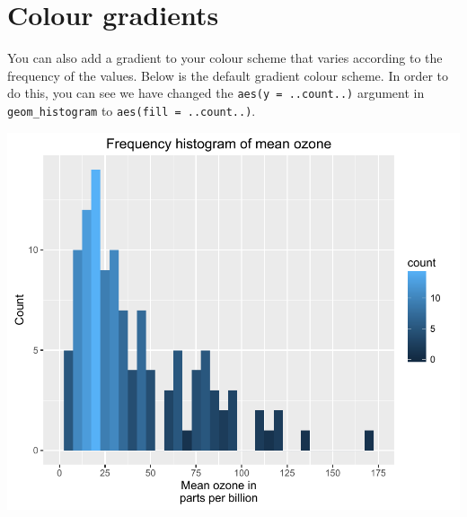 \section{Colour gradients}\label{colour-gradients}

You can also add a gradient to your colour scheme that varies according
to the frequency of the values. Below is the default gradient colour
scheme. In order to do this, you can see we have changed the
\texttt{aes(y\ =\ ..count..)} argument in \texttt{geom\_histogram} to
\texttt{aes(fill\ =\ ..count..)}.

\begin{Shaded}
\begin{Highlighting}[]
\StringTok{ }\NormalTok{(} \StringTok{ }
\StringTok{  }\NormalTok{(}\NormalTok{(}  \NormalTok{) +}
\StringTok{  }\NormalTok{(} \NormalTok{,}
     \NormalTok{(}\NormalTok{, }\NormalTok{, }\NormalTok{), }\NormalTok{(}\NormalTok{, }\NormalTok{)) +}
\StringTok{  }\NormalTok{(} \NormalTok{) +}
\StringTok{  }\NormalTok{(}\NormalTok{)}
\end{Highlighting}
\end{Shaded}

\begin{center}\includegraphics[width=0.6\linewidth]{7_Histograms_pdf/histogram_11-1} \end{center}

